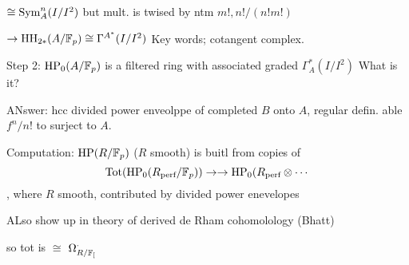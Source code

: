 $\cong \operatorname{Sym}_A^n(I/I^2)$ but mult. is twised by ntm $m!, n!/(n!m!)$

$\to \operatorname{HH}_{2*}(A/\mathbb{F}_p) \cong \Gamma^{A^*}(I/I^2)$
Key words; cotangent complex. 

Step 2: $\operatorname{HP}_0(A/\mathbb{F}_p)$ is a filtered ring with associated graded $\Gamma_A^*(I/I^2)$
What is it?

ANswer: hcc divided power enveolppe of completed $B$ onto $A$, regular defin. able $f^n/n!$ to surject to $A$. 



Computation: $\operatorname{HP}(R/\mathbb{F}_p)$ ($R$ smooth) is buitl from copies of 
	\[
	\operatorname{Tot}(\operatorname{HP}_0(R_{\text{perf}}/  \mathbb{F}_p)) \to \to \operatorname{HP}_0(R_{\text{perf}} \otimes \cdots
	\]
, where $R$ smooth, contributed by divided power enevelopes 

ALso show up in theory of derived de Rham cohomolology (Bhatt)

so tot is $\cong$ $\Omega_{R/\mathbb{F}_[}^\cdot$














































